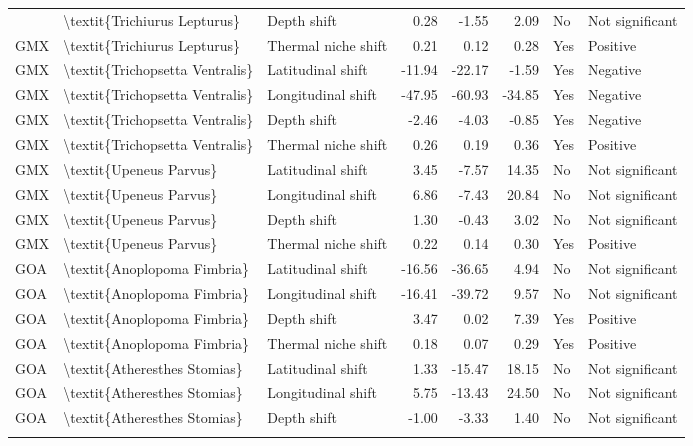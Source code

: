 \begin{longtable}[t]{lllrrrll}
{{GMX & \textbackslash{}textit\{Trichiurus Lepturus\} & Depth shift & 0.28 & -1.55 & 2.09 & No & Not significant\\
GMX & \textbackslash{}textit\{Trichiurus Lepturus\} & Thermal niche shift & 0.21 & 0.12 & 0.28 & Yes & Positive\\
\addlinespace
GMX & \textbackslash{}textit\{Trichopsetta Ventralis\} & Latitudinal shift & -11.94 & -22.17 & -1.59 & Yes & Negative\\
GMX & \textbackslash{}textit\{Trichopsetta Ventralis\} & Longitudinal shift & -47.95 & -60.93 & -34.85 & Yes & Negative\\
GMX & \textbackslash{}textit\{Trichopsetta Ventralis\} & Depth shift & -2.46 & -4.03 & -0.85 & Yes & Negative\\
GMX & \textbackslash{}textit\{Trichopsetta Ventralis\} & Thermal niche shift & 0.26 & 0.19 & 0.36 & Yes & Positive\\
GMX & \textbackslash{}textit\{Upeneus Parvus\} & Latitudinal shift & 3.45 & -7.57 & 14.35 & No & Not significant\\
\addlinespace
GMX & \textbackslash{}textit\{Upeneus Parvus\} & Longitudinal shift & 6.86 & -7.43 & 20.84 & No & Not significant\\
GMX & \textbackslash{}textit\{Upeneus Parvus\} & Depth shift & 1.30 & -0.43 & 3.02 & No & Not significant\\
GMX & \textbackslash{}textit\{Upeneus Parvus\} & Thermal niche shift & 0.22 & 0.14 & 0.30 & Yes & Positive\\
GOA & \textbackslash{}textit\{Anoplopoma Fimbria\} & Latitudinal shift & -16.56 & -36.65 & 4.94 & No & Not significant\\
GOA & \textbackslash{}textit\{Anoplopoma Fimbria\} & Longitudinal shift & -16.41 & -39.72 & 9.57 & No & Not significant\\
\addlinespace
GOA & \textbackslash{}textit\{Anoplopoma Fimbria\} & Depth shift & 3.47 & 0.02 & 7.39 & Yes & Positive\\
GOA & \textbackslash{}textit\{Anoplopoma Fimbria\} & Thermal niche shift & 0.18 & 0.07 & 0.29 & Yes & Positive\\
GOA & \textbackslash{}textit\{Atheresthes Stomias\} & Latitudinal shift & 1.33 & -15.47 & 18.15 & No & Not significant\\
GOA & \textbackslash{}textit\{Atheresthes Stomias\} & Longitudinal shift & 5.75 & -13.43 & 24.50 & No & Not significant\\
GOA & \textbackslash{}textit\{Atheresthes Stomias\} & Depth shift & -1.00 & -3.33 & 1.40 & No & Not significant\\
}}
\end{longtable}
